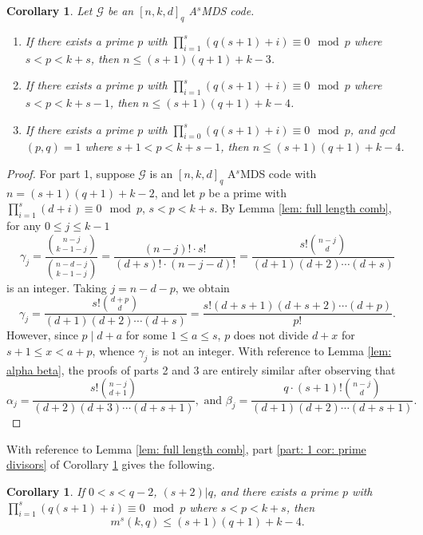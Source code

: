 \documentclass[11pt,a4paper]{amsart}
\newcommand{\AS}{ A$^s$MDS }
\newcommand{\G}{\mathcal{G}}
\theoremstyle{plain}
\newtheorem{corollary}[theorem]{Corollary}
\theoremstyle{definition}
\theoremstyle{remark}
\begin{document}
	\begin{corollary}\label{cor: prime divisors}
		Let $\G$ be an $[n,k,d]_q$ \AS code.
		\begin{enumerate}
			\item If there exists a prime $p$ with $\prod_{i=1}^{s} (q(s+1)+i) \equiv 0 \mod p$ where $s<p<k+s$, then $n\le (s+1)(q+1)+k-3$. \label{part: 1 cor: prime divisors}
			\item If there exists a prime $p$ with $\prod_{i=1}^{s} (q(s+1)+i) \equiv 0 \mod p$ where $s<p<k+s-1$, then $n\le (s+1)(q+1)+k-4$. \label{part: 2 cor: prime divisors}
			\item If there exists a prime $p$ with $\prod_{i=0}^{s} (q(s+1)+i) \equiv 0 \mod p$, and gcd$(p,q)=1$ where $s+1<p<k+s-1$, then $n\le (s+1)(q+1)+k-4$. \label{part: 3 cor: prime divisors}
		\end{enumerate}
	\end{corollary}
	\begin{proof}
		For part 1, suppose $\G$ is an $[n,k,d]_q$ \AS code with $n=(s+1)(q+1)+k-2$, and let $p$ be a prime with $\prod_{i=1}^{s} (d+i) \equiv 0 \mod p$, $s<p<k+s$. By Lemma \ref{lem: full length comb}, for any $0\le j \le k-1$
		\begin{equation}
			\gamma_j = \frac{{n-j\choose k-1-j}}{{n-d-j \choose k-1-j}} = \frac{(n-j)!\cdot s!}{(d+s)!\cdot (n-j-d)!} =\frac{s!{n-j \choose d}}{(d+1)(d+2)\cdots (d+s)}
		\end{equation}
		is an integer.  Taking $j=n-d-p$, we obtain
		\begin{equation}
			\gamma_j  =\frac{s!{d+p \choose d}}{(d+1)(d+2)\cdots (d+s)} =\frac{s!(d+s+1)(d+s+2)\cdots (d+p)}{p!}.
		\end{equation}
		However, since $p\mid d+a$ for some $1\le a\le s$, $p$ does not divide $d+x$ for $s+1\le x <a+p$, whence $\gamma_j$ is not an integer.
		With reference to Lemma \ref{lem: alpha beta}, the proofs of parts 2 and 3 are entirely similar after observing that
		\[
		\alpha_j = \frac{s!{n-j \choose d+1}}{(d+2)(d+3)\cdots (d+s+1)}, \text{ and } \beta_j = \frac{q\cdot (s+1)!{n-j \choose d}}{(d+1)(d+2)\cdots (d+s+1)}.
		\]
	\end{proof}

	With reference to Lemma \ref{lem: full length comb}, part  \ref{part: 1 cor: prime divisors} of Corollary \ref{cor: prime divisors} gives the following.

	\begin{corollary}\label{cor: cor prime divisors}
		If $0<s< q-2$,  $(s+2)|q$, and there exists a prime $p$ with $\prod_{i=1}^{s} (q(s+1)+i) \equiv 0 \mod p$ where $s<p<k+s$, then
		\[
		m^s(k,q) \le (s+1)(q+1)+k-4.
		\]
	\end{corollary}
\end{document}
